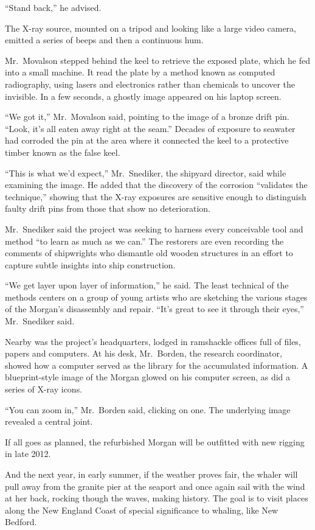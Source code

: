 ﻿\documentclass[12pt]{article}
\begin{document}
``Stand back,'' he advised.

The X-ray source, mounted on a tripod and looking like a large video camera, emitted a series of
beeps and then a continuous hum.

Mr.~Movalson stepped behind the keel to retrieve the exposed plate, which he fed into a small
machine. It read the plate by a method known as computed radiography, using lasers and electronics
rather than chemicals to uncover the invisible. In a few seconds, a ghostly image appeared on his
laptop screen.

``We got it,'' Mr.~Movalson said, pointing to the image of a bronze drift pin. ``Look, it's all
eaten away right at the seam.'' Decades of exposure to seawater had corroded the pin at the area
where it connected the keel to a protective timber known as the false keel.

``This is what we'd expect,'' Mr.~Snediker, the shipyard director, said while examining the image.
He added that the discovery of the corrosion ``validates the technique,'' showing that the X-ray
exposures are sensitive enough to distinguish faulty drift pins from those that show no
deterioration.

Mr.~Snediker said the project was seeking to harness every conceivable tool and method ``to learn as
much as we can.'' The restorers are even recording the comments of shipwrights who dismantle old
wooden structures in an effort to capture subtle insights into ship construction.

``We get layer upon layer of information,'' he said. The least technical of the methods centers on a
group of young artists who are sketching the various stages of the Morgan's disassembly and repair.
``It's great to see it through their eyes,'' Mr.~Snediker said.

Nearby was the project's headquarters, lodged in ramshackle offices full of files, papers and
computers. At his desk, Mr.~Borden, the research coordinator, showed how a computer served as the
library for the accumulated information. A blueprint-style image of the Morgan glowed on his
computer screen, as did a series of X-ray icons.

``You can zoom in,'' Mr.~Borden said, clicking on one. The underlying image revealed a central
joint.

If all goes as planned, the refurbished Morgan will be outfitted with new rigging in late 2012.

And the next year, in early summer, if the weather proves fair, the whaler will pull away from the
granite pier at the seaport and once again sail with the wind at her back, rocking though the waves,
making history. The goal is to visit places along the New England Coast of special significance to
whaling, like New Bedford.
\end{document}
